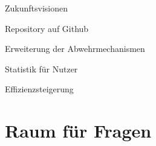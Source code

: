 \documentclass{beamer}
\begin{document}
\begin{frame}{Zukunftsvisionen}
    \begin{todolist} \pause
        \item Repository auf Github \pause
        \item Erweiterung der Abwehrmechanismen \pause
        \item Statistik für Nutzer \pause
        \item Effizienzsteigerung
    \end{todolist}
\end{frame}

\section{Raum für Fragen}
\end{document}
